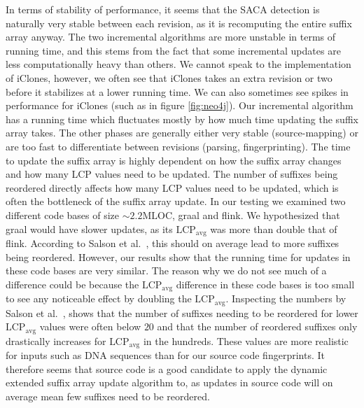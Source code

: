 In terms of stability of performance, it seems that the SACA detection is naturally very
stable between each revision, as it is recomputing the entire suffix array anyway. The two
incremental algorithms are more unstable in terms of running time, and this stems from the
fact that some incremental updates are less computationally heavy than others. We cannot
speak to the implementation of iClones, however, we often see that iClones takes an extra
revision or two before it stabilizes at a lower running time. We can also sometimes see
spikes in performance for iClones (such as in figure \ref{fig:neo4j}). Our incremental
algorithm has a running time which fluctuates mostly by how much time updating the suffix
array takes. The other phases are generally either very stable (source-mapping) or are too
fast to differentiate between revisions (parsing, fingerprinting). The time to update the
suffix array is highly dependent on how the suffix array changes and how many LCP values
need to be updated. The number of suffixes being reordered directly affects how many LCP
values need to be updated, which is often the bottleneck of the suffix array update. In
our testing we examined two different code bases of size ${\sim}2.2\text{MLOC}$, graal and
flink. We hypothesized that graal would have slower updates, as its
$\text{LCP}_\text{avg}$ was more than double that of flink. According to Salson et
al.~\cite{DynamicExtendedSuffixArraysReorderings}, this should on average lead to more
suffixes being reordered. However, our results show that the running time for updates in
these code bases are very similar. The reason why we do not see much of a difference could
be because the $\text{LCP}_\text{avg}$ difference in these code bases is too small to see
any noticeable effect by doubling the $\text{LCP}_\text{avg}$. Inspecting the numbers by
Salson et al.~\cite{DynamicExtendedSuffixArraysReorderings}, shows that the number of
suffixes needing to be reordered for lower $\text{LCP}_\text{avg}$ values were often below
$20$ and that the number of reordered suffixes only drastically increases for
$\text{LCP}_\text{avg}$ in the hundreds. These values are more realistic for inputs such
as DNA sequences than for our source code fingerprints. It therefore seems that source
code is a good candidate to apply the dynamic extended suffix array update algorithm to,
as updates in source code will on average mean few suffixes need to be reordered.

